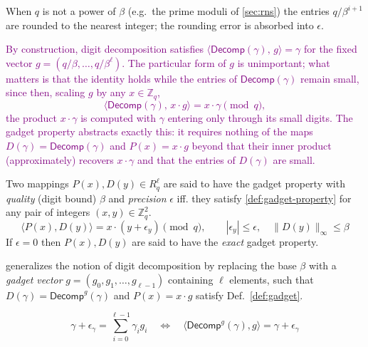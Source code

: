 \begin{remark}
    When $q$ is not a power of $\beta$ (e.g.\ the prime moduli of \autoref{sec:rns}) the entries $q/\beta^{i+1}$ are rounded to the nearest integer; the rounding error is absorbed into $\epsilon$.
\end{remark}

\textcolor{purple}{
By construction, digit decomposition satisfies $\langle \mathsf{Decomp}(\gamma),\, g \rangle = \gamma$ for the fixed vector $g = (q/\beta, \dots, q/\beta^{\ell})$. The particular form of $g$ is unimportant; what matters is that the identity holds while the entries of $\mathsf{Decomp}(\gamma)$ remain small, since then, scaling $g$ by any $x \in \mathbb{Z}_q$, \[ \langle \mathsf{Decomp}(\gamma),\, x \cdot g \rangle = x \cdot \gamma \pmod q, \] the product $x \cdot \gamma$ is computed with $\gamma$ entering only through its small digits. The gadget property abstracts exactly this: it requires nothing of the maps $D(\gamma) = \mathsf{Decomp}(\gamma)$ and $P(x) = x \cdot g$ beyond that their inner product (approximately) recovers $x \cdot \gamma$ and that the entries of $D(\gamma)$ are small.
}

\begin{definition}
    \label{def:gadget}
    Two mappings $P(x), D(y) \in R_q^\ell$ are said to have the gadget property with \textit{quality} (digit bound) $\beta$ and \textit{precision} $\epsilon$ iff. they satisfy \eqref{def:gadget-property} for any pair of integers $(x, y) \in \mathbb{Z}_q^2$.
    \begin{equation}
        \label{def:gadget-property}
        \langle P(x), D(y)\rangle = x\cdot (y + \epsilon_y) \pmod{q},
        \qquad |\epsilon_y| \leq \epsilon, \quad \|D(y)\|_\infty \leq \beta
    \end{equation}
    If $\epsilon = 0$ then $P(x), D(y)$ are said to have the \textit{exact} gadget property.
\end{definition}

\begin{definition}
    generalizes the notion of digit decomposition by replacing the base $\beta$ with a \textit{gadget vector} $g = (g_0, g_1, \dots, g_{\ell-1})$ containing $\ell$ elements, such that $D(\gamma) = \mathsf{Decomp}^g(\gamma)$ and $P(x) = x\cdot g$ satisfy Def.~\ref{def:gadget}.

    \begin{equation*}
        \label{def:gadget-decomp}
        \gamma + \epsilon_\gamma = \sum_{i=0}^{\ell - 1} \gamma_i g_i \quad\iff\quad \langle \mathsf{Decomp}^g(\gamma), g\rangle = \gamma + \epsilon_\gamma
    \end{equation*}
\end{definition}

